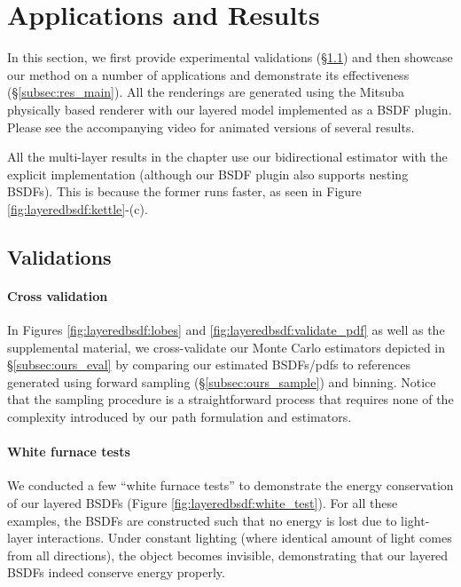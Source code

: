 \section{Applications and Results}
\label{sec:layeredbsdf:results}

In this section, we first provide experimental validations (\S\ref{subsec:res_validation}) and then showcase our method on a number of applications and demonstrate its effectiveness (\S\ref{subsec:res_main}).
All the renderings are generated using the Mitsuba physically based renderer \cite{jakob2010mitsuba} with our layered model implemented as a BSDF plugin.
Please see the accompanying video for animated versions of several results.

All the multi-layer results in the chapter use our bidirectional estimator with the explicit implementation (although our BSDF plugin also supports nesting BSDFs).
This is because the former runs faster, as seen in Figure \ref{fig:layeredbsdf:kettle}-(c).

\subsection{Validations}
\label{subsec:res_validation}

\paragraph{Cross validation}
In Figures \ref{fig:layeredbsdf:lobes} and \ref{fig:layeredbsdf:validate_pdf} as well as the supplemental material, we cross-validate our Monte Carlo estimators depicted in \S\ref{subsec:ours_eval} by comparing our estimated BSDFs/pdfs to references generated using forward sampling (\S\ref{subsec:ours_sample}) and binning. Notice that the sampling procedure is a straightforward process that requires none of the complexity introduced by our path formulation and estimators.

\paragraph{White furnace tests}
We conducted a few ``white furnace tests'' to demonstrate the energy conservation of our layered BSDFs (Figure \ref{fig:layeredbsdf:white_test}).
For all these examples, the BSDFs are constructed such that no energy is lost due to light-layer interactions.
Under constant lighting (where identical amount of light comes from all directions), the object becomes invisible, demonstrating that our layered BSDFs indeed conserve energy properly.

